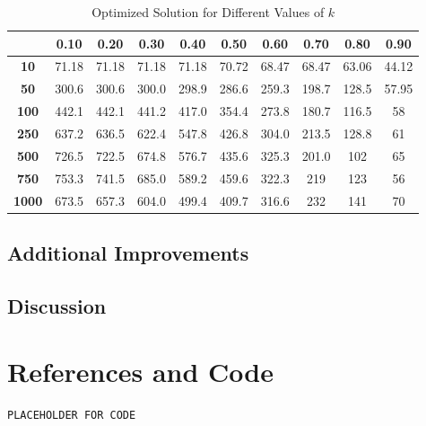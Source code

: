 \documentclass[12pt,a4paper]{article}
\begin{document}
\begin{table}[h!]
    \centering
    \setlength{\arrayrulewidth}{0.5mm} %
    \renewcommand{\arraystretch}{1.5} %
    \begin{tabular}{|c|c|c|c|c|c|c|c|c|c|}
    \hline
    \rowcolor{black!75} %
    & \color{white}\textbf{0.10} & \color{white}\textbf{0.20} & \color{white}\textbf{0.30} & \color{white}\textbf{0.40} & \color{white}\textbf{0.50} & \color{white}\textbf{0.60} & \color{white}\textbf{0.70} & \color{white}\textbf{0.80} & \color{white}\textbf{0.90} \\ \hline
    \cellcolor{black!75}\color{white}\textbf{10}   & 71.18 & 71.18 & 71.18 & 71.18 & 70.72 & 68.47 & 68.47 & 63.06 & 44.12 \\ \hline
    \cellcolor{black!75}\color{white}\textbf{50}    & 300.6 & 300.6 & 300.0 & 298.9 & 286.6 & 259.3 & 198.7 & 128.5 & 57.95 \\ \hline
    \cellcolor{black!75}\color{white}\textbf{100}   & 442.1 & 442.1 & 441.2 & 417.0 & 354.4 & 273.8 & 180.7 & 116.5 & 58 \\ \hline
    \cellcolor{black!75}\color{white}\textbf{250}   & 637.2 & 636.5 & 622.4 & 547.8 & 426.8 & 304.0 & 213.5 & 128.8 & 61 \\ \hline
    \cellcolor{black!75}\color{white}\textbf{500}   & 726.5 & 722.5 & 674.8 & 576.7 & 435.6 & 325.3 & 201.0 & 102 & 65 \\ \hline
    \cellcolor{black!75}\color{white}\textbf{750}   & 753.3 & 741.5 & 685.0 & 589.2 & 459.6 & 322.3 & 219 & 123 & 56 \\ \hline
    \cellcolor{black!75}\color{white}\textbf{1000}  & 673.5 & 657.3 & 604.0 & 499.4 & 409.7 & 316.6 & 232 & 141 & 70 \\ \hline
    \end{tabular}
    \caption{Optimized Solution for Different Values of $k$}
\end{table}

\subsection{Additional Improvements}

\newpage
\subsection{Discussion}

\newpage
\section{References and Code}

\begin{lstlisting}[style=Matlab-Pyglike]
PLACEHOLDER FOR CODE
\end{lstlisting}
\end{document}
